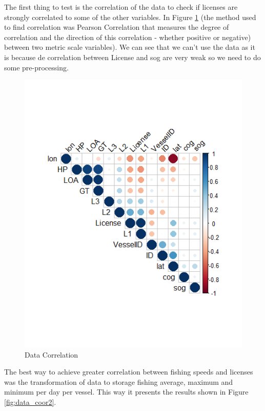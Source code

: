 The first thing to test is the correlation of the data to check if licenses are strongly correlated to some of the other variables. In Figure \ref{fig:data_coor1} (the method used to find correlation was Pearson Correlation \cite{Benesty2009} that measures the degree of correlation and the direction of this correlation - whether positive or negative) between two metric scale variables). We can see that we can’t use the data as it is because de correlation between License and sog are very weak so we need to do some pre-processing.
\begin{figure}[h]
    \centering
    \includegraphics[width=0.7\linewidth]{Chapters/img/data_coor1.png}
    \caption{Data Correlation}
    \label{fig:data_coor1}
\end{figure}




The best way to achieve greater correlation between fishing speeds and licenses was the transformation of data to storage fishing average, maximum and minimum per day per vessel. This way it presents the results shown in Figure \ref{fig:data_coor2}.

